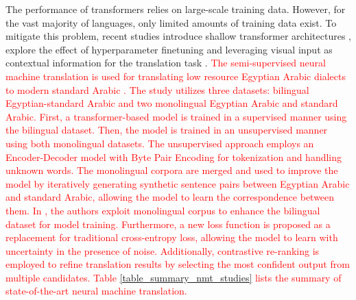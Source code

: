 \documentclass[preprint,12pt]{elsarticle}
\begin{document}
The performance of transformers relies on large-scale training data. However, for the vast majority of languages, only limited amounts of training data exist. To mitigate this problem, recent studies introduce shallow transformer architectures \citep{gezmu_transformers_2022}, explore the effect of hyperparameter finetuning \citep{araabi_optimizing_2020} and leveraging visual input as contextual information for the translation task \citep{meetei_cues_2023}. \textcolor{red}{The semi-supervised neural machine translation is used for translating low resource Egyptian Arabic dialects to modern standard Arabic \citep{faheem_improving_2024}. The study utilizes three datasets: bilingual Egyptian-standard Arabic and two monolingual Egyptian Arabic and standard Arabic. First, a transformer-based model is trained in a supervised manner using the bilingual dataset. Then, the model is trained in an unsupervised manner using both monolingual datasets. The unsupervised approach employs an Encoder-Decoder model with Byte Pair Encoding for tokenization and handling unknown words. The monolingual corpora are merged and used to improve the model by iteratively generating synthetic sentence pairs between Egyptian Arabic and standard Arabic, allowing the model to learn the correspondence between them. In \citep{li_towards_2024}, the authors exploit monolingual corpus to enhance the bilingual dataset for model training. Furthermore, a new loss function is proposed as a replacement for traditional cross-entropy loss, allowing the model to learn with uncertainty in the presence of noise. Additionally, contrastive re-ranking is employed to refine translation results by selecting the most confident output from multiple candidates. Table \ref{table_summary_nmt_studies} lists the summary of state-of-the-art neural machine translation.}
\end{document}
